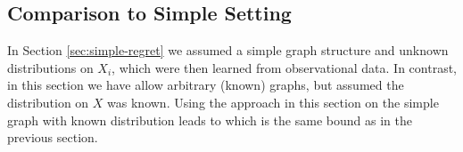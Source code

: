 \subsection*{Comparison to Simple Setting}

In Section \ref{sec:simple-regret} we assumed a simple graph structure and unknown distributions on $X_i$, which were then learned from observational
data. In contrast, in this section we have allow arbitrary (known) graphs, but assumed the distribution on $X$ was known. 
Using the approach in this section on the simple graph with known distribution leads to 
which is the same bound as in the previous section. 





